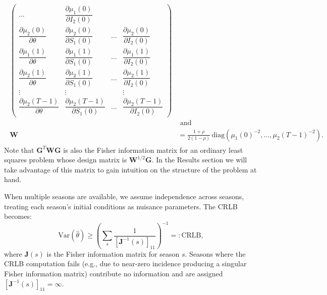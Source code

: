 \documentclass[9pt,twocolumn,twoside]{pnas-new}
\begin{document}
{\begin{align}
\begin{split}
\begin{pmatrix}
    \dots &
    \dfrac{\partial \mu_1(0)}{\partial I_2(0)} \\[10pt]
    \dfrac{\partial \mu_2(0)}{\partial \theta} &
    \dfrac{\partial \mu_2(0)}{\partial S_1(0)} &
    \dots &
    \dfrac{\partial \mu_2(0)}{\partial I_2(0)} \\[10pt]
    \dfrac{\partial \mu_1(1)}{\partial \theta} &
    \dfrac{\partial \mu_1(1)}{\partial S_1(0)} &
    \dots &
    \dfrac{\partial \mu_1(1)}{\partial I_2(0)} \\[10pt]
    \dfrac{\partial \mu_2(1)}{\partial \theta} &
    \dfrac{\partial \mu_2(1)}{\partial S_1(0)} &
    \dots &
    \dfrac{\partial \mu_2(1)}{\partial I_2(0)} \\[10pt]
    \vdots & \vdots &  & \vdots
    \\[6pt]
    \dfrac{\partial \mu_2(T{-}1)}{\partial \theta} &
    \dfrac{\partial \mu_2(T{-}1)}{\partial S_1(0)} &
    \dots &
    \dfrac{\partial \mu_2(T{-}1)}{\partial I_2(0)}
  \end{pmatrix} \\
  &\text{ and } \\
  \mathbf{W} &= \frac{1+\rho}{2(1-\rho)}\,\text{diag}(\mu_1(0)^{-2},
  \ldots, \mu_2(T{-}1)^{-2}).
  \end{split}
\end{align}
Note that $\mathbf{G}^T\mathbf{WG}$ is also the Fisher information
matrix for an ordinary least squares problem whose design matrix is
$\mathbf{W}^{1/2}\mathbf{G}$. In the Results section we will take
advantage of this matrix to gain intuition on the structure of the
problem at hand.


When multiple seasons are available, we assume independence across
seasons, treating each season's initial conditions as nuisance
parameters. The CRLB becomes:
\begin{equation}\label{eq:crlb_multi}
\text{Var}(\hat{\theta}) \geq \left(\sum_{s} \frac{1}{
  [\mathbf{J}^{-1}(s)]_{11}}\right)^{-1} =: \text{CRLB},
\end{equation}
where $\mathbf{J}(s)$ is the Fisher information matrix for season $s$.
Seasons where the CRLB computation fails (e.g., due to near-zero
incidence producing a singular Fisher information matrix) contribute
no information and are assigned $[\mathbf{J}^{-1}(s)]_{11} = \infty$.

}
\end{document}
